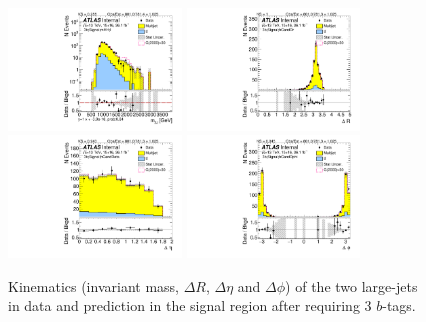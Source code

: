 \begin{figure}[htb!]
\begin{center}
\includegraphics[width=0.41\textwidth,angle=-90]{figures/boosted/Signal/b77_ThreeTag_Signal_mHH_l_1.pdf}
\includegraphics[width=0.41\textwidth,angle=-90]{figures/boosted/Signal/b77_ThreeTag_Signal_hCandDr.pdf}\\
\includegraphics[width=0.41\textwidth,angle=-90]{figures/boosted/Signal/b77_ThreeTag_Signal_hCandDeta.pdf}
\includegraphics[width=0.41\textwidth,angle=-90]{figures/boosted/Signal/b77_ThreeTag_Signal_hCandDphi.pdf}
  \caption{Kinematics (invariant mass, $\Delta R$, $\Delta \eta$ and $\Delta \phi$) of the two large-\R jets in data and prediction in the signal region after requiring 3 $b$-tags.  }
  \label{fig:boosted-3b-signal-ak10-system}
\end{center}
\end{figure}

\clearpage


